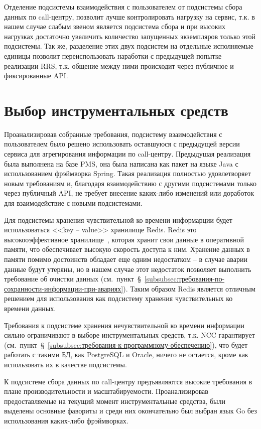 Отделение подсистемы взаимодействия с пользователем от подсистемы сбора данных по call-центру,
позволит лучше контролировать нагрузку на сервис,
т.к. в нашем случае слабым звеном является подсистема сбора
и при высоких нагрузках достаточно увеличить количество запущенных экземпляров только этой подсистемы.
Так же, разделение этих двух подсистем на отдельные
исполняемые единицы позволит переиспользовать наработки с предыдущей попытке реализации RRS\@,
т.к. общение между ними происходит через публичное и фиксированные API\@.

\section{Выбор инструментальных средств}

Проанализировав собранные требования, подсистему взаимодействия с пользователем было решено
использовать оставшуюся с предыдущей версии сервиса для агрегирования информации по call-центру.
Предыдушая реализация была выполнена на базе PMS, она была написана как пакет на языке Java с
использованием фрэймворка Spring.
Такая реализация полностью удовлетворяет новым требованиям
и, благодаря взаимодействию с другими подсистемами только через публичный API,
не требует внесение каких-либо изменений или доработок для взаимодействие с новыми подсистемами.

Для подсистемы хранения чувствительной ко времени информарции будет использоваться
<<key -- value>> хранилище Redis.
Redis это высокооэффективное хранилище~\cite{HowfastisRedis},
которая хранит свои данные в оперативной памяти,
что обеспечивает высокую скорость доступа к ним.
Хранение данных в памяти помимо достоинств обладает еще одним недостатком --
в случае аварии данные будут утеряны,
но в нашем случае этот недостаток позволяет выполнить требование об очистки данных (см.~пункт~\S~\ref{subsubsec:требования-по-сохранности-информации-при-авариях}).
Таким образом Redis является отличным решением для использования как подсистему хранения
чувствительных ко времени данных.

Требования к подсистеме хранения нечувствительной ко времени информации сильно ограничивают
в выборе инструментальных средств, т.к. NCC гарантирует (см.~пункт~\S~\ref{subsubsec:требования-к-программному-обеспечению}),
что будет работать с такими БД, как PostgreSQL и Oracle,
ничего не остается, кроме как использовать их в качестве подсистемы.

К подсистеме сбора данных по call-центру предъявляются
высокие требования в плане производительности и масштабируемости.
Проанализировав предоставляемые на текущий момент инструментальные средства,
были выделены основные фавориты и среди них окончательно был выбран язык Go без использования
каких-либо фрэймворках.

